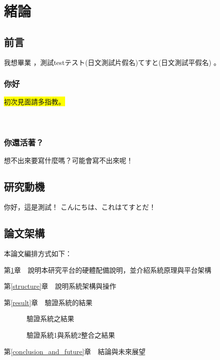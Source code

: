 \chapter{緒論}\label{explanation}


\section{前言}\label{1-1}
我想畢業 \cite{m1}，測試testテスト(日文測試片假名)てすと(日文測試平假名)\cite{talbot97} 。

\subsection{你好}
\colorbox{yellow}{初次見面請多指教。} \\
\color{blue}{初めまして、よろしくお願いします！} \\
 \\
\color{black}

\subsection{你還活著？}
想不出來要寫什麼嗎？可能會寫不出來呢！\cite{goossens97}

\newpage

\section{研究動機}\label{1-2}
你好，這是測試！
こんにちは、これはてすとだ！

\newpage

\section{論文架構}\label{1-3}
\n 本論文編排方式如下：

第\ref{explanation}章　說明本研究平台的硬體配備說明，並介紹系統原理與平台架構

第\ref{structure}章　說明系統架構與操作

第\ref{result}章　驗證系統的結果
		
　　　      驗證系統之結果

　　　      驗證系統1與系統2整合之結果

第\ref{conclusion_and_future}章　結論與未來展望

